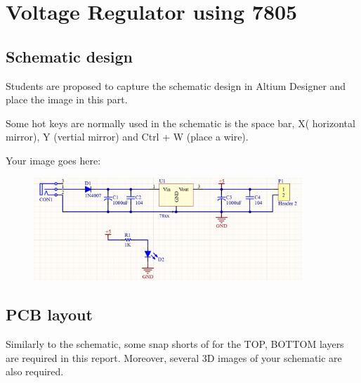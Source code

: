 \section{Voltage Regulator using 7805}
\subsection{Schematic design}
Students are proposed to capture the schematic design in Altium Designer and place the image in this part.

Some hot keys are normally used in the schematic is the space bar, X( horizontal mirror), Y (vertial mirror) and Ctrl + W (place a wire).

Your image goes here:

\begin{figure}[h]
    \centering
    \includegraphics[width=0.9\textwidth]{graphics/ex1/f1.PNG}
\end{figure}

\subsection{PCB layout}
Similarly to the schematic, some snap shorts of for the TOP, BOTTOM layers are required in this report. Moreover, several 3D images of your schematic are also required.

